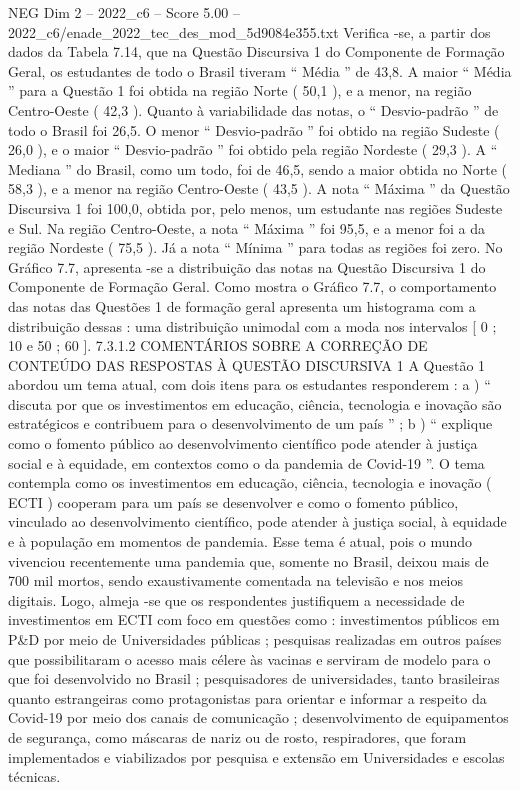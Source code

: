 \begin{textsample}{NEG Dim 2 – 2022\_c6 – Score 5.00 – 2022\_c6/enade\_2022\_tec\_des\_mod\_5d9084e355.txt}
Verifica -se, a partir dos dados da Tabela 7.14, que na Questão Discursiva 1 do Componente de Formação Geral, os estudantes de todo o Brasil tiveram “ Média ” de 43,8.
A maior “ Média ” para a Questão 1 foi obtida na região Norte ( 50,1 ), e a menor, na região Centro-Oeste ( 42,3 ).
Quanto à variabilidade das notas, o “ Desvio-padrão ” de todo o Brasil foi 26,5.
O menor “ Desvio-padrão ” foi obtido na região Sudeste ( 26,0 ), e o maior “ Desvio-padrão ” foi obtido pela região Nordeste ( 29,3 ).
A “ Mediana ” do Brasil, como um todo, foi de 46,5, sendo a maior obtida no Norte ( 58,3 ), e a menor na região Centro-Oeste ( 43,5 ).
A nota “ Máxima ” da Questão Discursiva 1 foi 100,0, obtida por, pelo menos, um estudante nas regiões Sudeste e Sul.
Na região Centro-Oeste, a nota “ Máxima ” foi 95,5, e a menor foi a da região Nordeste ( 75,5 ).
Já a nota “ Mínima ” para todas as regiões foi zero.
No Gráfico 7.7, apresenta -se a distribuição das notas na Questão Discursiva 1 do Componente de Formação Geral.
Como mostra o Gráfico 7.7, o comportamento das notas das Questões 1 de formação geral apresenta um histograma com a distribuição dessas : uma distribuição unimodal com a moda nos intervalos [ 0 ; 10 e 50 ; 60 ]. 7.3.1.2 COMENTÁRIOS SOBRE A CORREÇÃO DE CONTEÚDO DAS RESPOSTAS À QUESTÃO DISCURSIVA 1 A Questão 1 abordou um tema atual, com dois itens para os estudantes responderem : a ) “ discuta por que os investimentos em educação, ciência, tecnologia e inovação são estratégicos e contribuem para o desenvolvimento de um país ” ; b ) “ explique como o fomento público ao desenvolvimento científico pode atender à justiça social e à equidade, em contextos como o da pandemia de Covid-19 ”.
O tema contempla como os investimentos em educação, ciência, tecnologia e inovação ( ECTI ) cooperam para um país se desenvolver e como o fomento público, vinculado ao desenvolvimento científico, pode atender à justiça social, à equidade e à população em momentos de pandemia.
Esse tema é atual, pois o mundo vivenciou recentemente uma pandemia que, somente no Brasil, deixou mais de 700 mil mortos, sendo exaustivamente comentada na televisão e nos meios digitais.
Logo, almeja -se que os respondentes justifiquem a necessidade de investimentos em ECTI com foco em questões como : investimentos públicos em P\&D por meio de Universidades públicas ; pesquisas realizadas em outros países que possibilitaram o acesso mais célere às vacinas e serviram de modelo para o que foi desenvolvido no Brasil ; pesquisadores de universidades, tanto brasileiras quanto estrangeiras como protagonistas para orientar e informar a respeito da Covid-19 por meio dos canais de comunicação ; desenvolvimento de equipamentos de segurança, como máscaras de nariz ou de rosto, respiradores, que foram implementados e viabilizados por pesquisa e extensão em Universidades e escolas técnicas.

\end{textsample}
